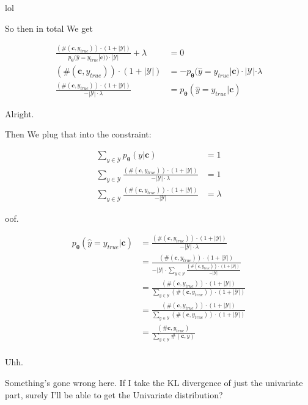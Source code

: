 \documentclass{article}
\newcommand{\vtheta}{\boldsymbol{\theta}}
\newcommand{\model}{p_{\vtheta}}
\newcommand{\context}{\boldsymbol{c}}
\begin{document}
		lol
		
		So then in total We get
		
		\begin{align}
			\frac{(\#(\context, y_{true}))\cdot (1 + |\mathcal{Y}|)}{\model(\hat{y} = y_{true}|\context)) \cdot |\mathcal{Y}|} + \lambda &= 0\\
			(\#(\context, y_{true}))\cdot (1 + |\mathcal{Y}|) &= - \model(\hat{y} = y_{true}|\context) \cdot |\mathcal{Y}|\cdot \lambda \\
			\frac{(\#(\context, y_{true}))\cdot (1 + |\mathcal{Y}|)}{- |\mathcal{Y}|\cdot \lambda 	} &=  \model(\hat{y} = y_{true}|\context) 
		\end{align}
		
		Alright.
		
		Then We plug that into the constraint:
		
		\begin{align}
			\sum_{y\in\mathcal{Y}} \model(y|\context) &= 1\\
			\sum_{y\in\mathcal{Y}} \frac{(\#(\context, y_{true}))\cdot (1 + |\mathcal{Y}|)}{- |\mathcal{Y}|\cdot \lambda } &= 1\\
			\sum_{y\in\mathcal{Y}} \frac{(\#(\context, y_{true}))\cdot (1 + |\mathcal{Y}|)}{- |\mathcal{Y}| } &= \lambda
		\end{align}
		
		oof.
		
		\begin{align}
			\model(\hat{y} = y_{true}|\context) &= \frac{(\#(\context, y_{true}))\cdot (1 + |\mathcal{Y}|)}{- |\mathcal{Y}|\cdot \lambda}\\
			&= \frac{(\#(\context, y_{true}))\cdot (1 + |\mathcal{Y}|)}{- |\mathcal{Y}|\cdot \sum_{y\in\mathcal{Y}} \frac{(\#(\context, y_{true}))\cdot (1 + |\mathcal{Y}|)}{- |\mathcal{Y}| }}\\
			&= \frac{(\#(\context, y_{true}))\cdot (1 + |\mathcal{Y}|)}{\sum_{y\in\mathcal{Y}} (\#(\context, y_{true}))\cdot (1 + |\mathcal{Y}|)}\\
			&= \frac{(\#(\context, y_{true}))\cdot (1 + |\mathcal{Y}|)}{\sum_{y\in\mathcal{Y}} (\#(\context, y_{true}))\cdot (1 + |\mathcal{Y}|)}\\
			&= \frac{(\#\context, y_{true})}{\sum_{y\in\mathcal{Y}} \#(\context, y)}\\
		\end{align}
		
		Uhh.
		
		Something's gone wrong here. If I take the KL divergence of just the univariate part, surely I'll be able to get the Univariate distribution?
		
\end{document}
